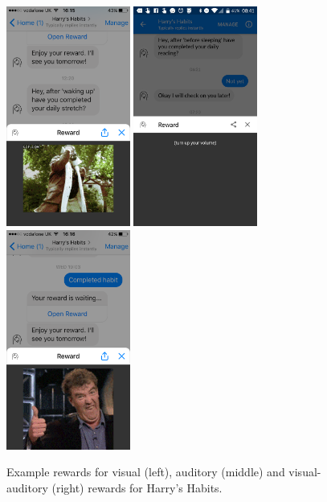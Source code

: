 \begin{figure}[H]
  \centering
  \includegraphics[width=1.6in]{resources/design/reward-visual-2.png}
  \hspace{5px}
  \includegraphics[width=1.6in]{resources/design/reward-audio.png}
  \hspace{5px}
  \includegraphics[width=1.6in]{resources/design/reward-visual-gif-2.png}
  \caption{Example rewards for visual (left), auditory (middle) and visual-auditory (right) rewards for Harry's Habits.}
  \label{fig:visual_audio_combined_rewards}
\end{figure}

